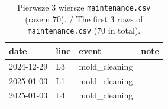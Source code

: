 \begin{table}[H]\centering\footnotesize\ttfamily
\begin{tabular}{@{}llll@{}}\toprule
date & line & event & note \\\midrule
2024-12-29 & L3 & mold\_cleaning &  \\
2025-01-03 & L1 & mold\_cleaning &  \\
2025-01-03 & L4 & mold\_cleaning &  \\
\bottomrule\end{tabular}
\caption{Pierwsze 3 wiersze \texttt{maintenance.csv} (razem 70). / The first 3 rows of \texttt{maintenance.csv} (70 in total).}
\end{table}
